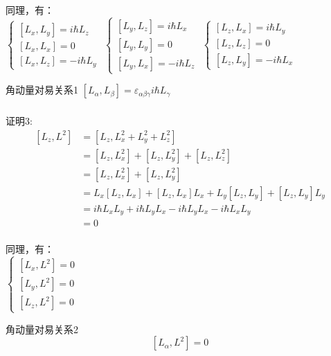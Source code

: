 \begin{frame} 
    同理，有：\\
    $\begin{cases}
        [L_x,L_y]= i\hbar L_z  \\ 
        [L_x,L_x]= 0  \\ 
        [L_x,L_z]= -i\hbar L_y 
    \end{cases}$
    $\begin{cases}
        [L_y,L_z]= i\hbar L_x  \\ 
        [L_y,L_y]= 0  \\ 
        [L_y,L_x]= -i\hbar L_z 
    \end{cases}$
    $\begin{cases}
        [L_z,L_x]= i\hbar L_y  \\ 
        [L_z,L_z]= 0  \\ 
        [L_z,L_y]= -i\hbar L_x 
    \end{cases}$
    \begin{atcbox}{角动量对易关系1}
        $ [L_\alpha,L_\beta]= \varepsilon_{\alpha\beta\gamma} i\hbar L_\gamma $ 
    \end{atcbox}
\end{frame} 

\begin{frame}
    \frametitle{}
    \alert{证明3:} 
    \begin{equation*}
        \begin{split}
        [L_z,L^2]&= [L_z,L_x ^2+L_y ^2+L_z ^2]\\
        &=[L_z,L_x ^2]+[L_z,L_y ^2]+[L_z,L_z ^2]\\
        &=[L_z,L_x ^2]+[L_z,L_y ^2]\\
        &=L_x[L_z,L_x] +[L_z,L_x]L_x +L_y[L_z,L_y] +[L_z,L_y]L_y\\
        &=i\hbar L_x L_y +i\hbar L_yL_x -i\hbar L_yL_x- i\hbar L_xL_y \\
        &=0 \\
        \end{split}  
    \end{equation*}
\end{frame} 

\begin{frame}     
    同理，有：\\
    $\begin{cases}
        [L_x,L^2]= 0  \\ 
        [L_y,L^2]= 0  \\ 
        [L_z,L^2]= 0 
    \end{cases}$
    \begin{atcbox}{角动量对易关系2}
        $$ [L_\alpha,L^2]= 0 $$ 
    \end{atcbox}
\end{frame} 

